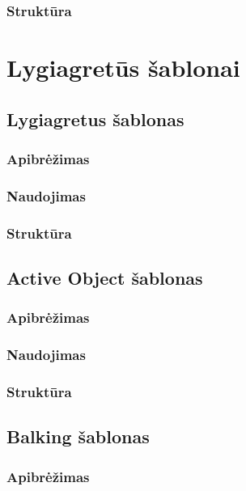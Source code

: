 \documentclass[10pt]{IEEEtran}
\begin{document}
			\subsubsection{Struktūra}

	\section{Lygiagretūs šablonai}

		\subsection{Lygiagretus šablonas}

			\subsubsection{Apibrėžimas}

			\subsubsection{Naudojimas}

			\subsubsection{Struktūra}

		\subsection{Active Object šablonas}

			\subsubsection{Apibrėžimas}

			\subsubsection{Naudojimas}

			\subsubsection{Struktūra}

		\subsection{Balking šablonas}

			\subsubsection{Apibrėžimas}
\end{document}
